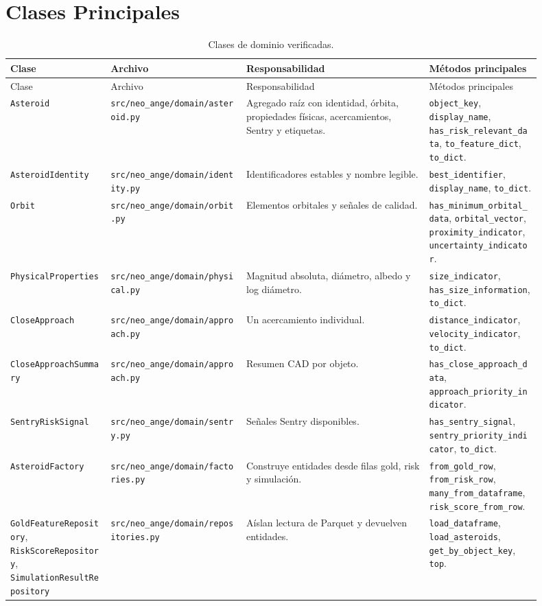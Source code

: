 \documentclass[12pt,a4paper]{report}
\newcommand{\code}[1]{\texttt{#1}}
\DeclareRobustCommand{\filepath}[1]{\nolinkurl{#1}}
\begin{document}
\section{Clases Principales}

{\footnotesize
\setlength{\tabcolsep}{3.5pt}
\begin{longtable}{>{\RaggedRight\arraybackslash}p{0.17\linewidth}>{\RaggedRight\arraybackslash}p{0.23\linewidth}>{\RaggedRight\arraybackslash}p{0.31\linewidth}>{\RaggedRight\arraybackslash}p{0.19\linewidth}}
\caption{Clases de dominio verificadas.}\\
\toprule
Clase & Archivo & Responsabilidad & Métodos principales\\
\midrule
\endfirsthead
\toprule
Clase & Archivo & Responsabilidad & Métodos principales\\
\midrule
\endhead
\code{Asteroid} & \filepath{src/neo_ange/domain/asteroid.py} & Agregado raíz con identidad, órbita, propiedades físicas, acercamientos, Sentry y etiquetas. & \code{object\_key}, \code{display\_name}, \code{has\_risk\_relevant\_data}, \code{to\_feature\_dict}, \code{to\_dict}.\\
\code{AsteroidIdentity} & \filepath{src/neo_ange/domain/identity.py} & Identificadores estables y nombre legible. & \code{best\_identifier}, \code{display\_name}, \code{to\_dict}.\\
\code{Orbit} & \filepath{src/neo_ange/domain/orbit.py} & Elementos orbitales y señales de calidad. & \code{has\_minimum\_orbital\_data}, \code{orbital\_vector}, \code{proximity\_indicator}, \code{uncertainty\_indicator}.\\
\code{PhysicalProperties} & \filepath{src/neo_ange/domain/physical.py} & Magnitud absoluta, diámetro, albedo y log diámetro. & \code{size\_indicator}, \code{has\_size\_information}, \code{to\_dict}.\\
\code{CloseApproach} & \filepath{src/neo_ange/domain/approach.py} & Un acercamiento individual. & \code{distance\_indicator}, \code{velocity\_indicator}, \code{to\_dict}.\\
\code{CloseApproachSummary} & \filepath{src/neo_ange/domain/approach.py} & Resumen CAD por objeto. & \code{has\_close\_approach\_data}, \code{approach\_priority\_indicator}.\\
\code{SentryRiskSignal} & \filepath{src/neo_ange/domain/sentry.py} & Señales Sentry disponibles. & \code{has\_sentry\_signal}, \code{sentry\_priority\_indicator}, \code{to\_dict}.\\
\code{AsteroidFactory} & \filepath{src/neo_ange/domain/factories.py} & Construye entidades desde filas gold, risk y simulación. & \code{from\_gold\_row}, \code{from\_risk\_row}, \code{many\_from\_dataframe}, \code{risk\_score\_from\_row}.\\
\code{GoldFeatureRepository}, \code{RiskScoreRepository}, \code{SimulationResultRepository} & \filepath{src/neo_ange/domain/repositories.py} & Aíslan lectura de Parquet y devuelven entidades. & \code{load\_dataframe}, \code{load\_asteroids}, \code{get\_by\_object\_key}, \code{top}.\\
\bottomrule
\end{longtable}
}
\end{document}
